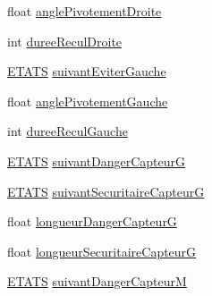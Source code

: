 \begin{DoxyCompactItemize}
\item 
float \hyperlink{group__inf2990_gaa0e5389e4cc351f2e7e3396dee743c99}{angle\+Pivotement\+Droite}
\item 
int \hyperlink{group__inf2990_ga7dfec55a332c75910ba13fa6dda943e2}{duree\+Recul\+Droite}
\item 
\hyperlink{group__inf2990_gad63ae859c24061076ed6dbe35f4671b5}{E\+T\+A\+TS} \hyperlink{group__inf2990_gaa6ddaba5a130435ed5c68a8279784c69}{suivant\+Eviter\+Gauche}
\item 
float \hyperlink{group__inf2990_ga5a77961284de1d291629c5bf0bc1b0b3}{angle\+Pivotement\+Gauche}
\item 
int \hyperlink{group__inf2990_ga0cf12057d78fb89bd3b10892fec7ec3a}{duree\+Recul\+Gauche}
\item 
\hyperlink{group__inf2990_gad63ae859c24061076ed6dbe35f4671b5}{E\+T\+A\+TS} \hyperlink{group__inf2990_gaa24c88ba3ff659805e58df57c8208591}{suivant\+Danger\+CapteurG}
\item 
\hyperlink{group__inf2990_gad63ae859c24061076ed6dbe35f4671b5}{E\+T\+A\+TS} \hyperlink{group__inf2990_ga39cd87b79ec9afb397bcb78cbd88aa27}{suivant\+Securitaire\+CapteurG}
\item 
float \hyperlink{group__inf2990_ga7ccdc8fc8395a915c28cf7bcbb0b21db}{longueur\+Danger\+CapteurG}
\item 
float \hyperlink{group__inf2990_ga4a8ec805917461611cbdbf0c335c6d72}{longueur\+Securitaire\+CapteurG}
\item 
\hyperlink{group__inf2990_gad63ae859c24061076ed6dbe35f4671b5}{E\+T\+A\+TS} \hyperlink{group__inf2990_gab3c0547222b8ea6155f20fb83b89c6cf}{suivant\+Danger\+CapteurM}

\end{DoxyCompactItemize}
